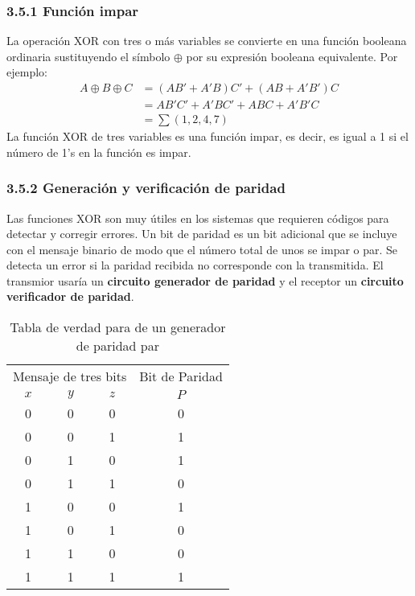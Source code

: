 \subsubsection*{3.5.1 Funci\'{o}n impar} La operaci\'{o}n XOR con tres o
m\'{a}s variables se convierte en una funci\'{o}n booleana ordinaria
sustituyendo el s\'{i}mbolo $\oplus$ por su expresi\'{o}n booleana equivalente.
Por ejemplo: \begin{align*} A \oplus B \oplus C & = (AB' + A'B)C' + (AB + A'B')C
               \\ &= AB'C' + A'BC' + ABC + A'B'C \\ &= \sum (1, 2, 4, 7)\end{align*} La
funci\'{o}n XOR de tres variables es una funci\'{o}n impar, es decir, es igual a
1 si el n\'{u}mero de 1's en la funci\'{o}n es impar.

\subsubsection*{3.5.2 Generaci\'{o}n y verificaci\'{o}n de paridad} Las
funciones XOR son muy \'{u}tiles en los sistemas que requieren c\'{o}digos para
detectar y corregir errores. Un bit de paridad es un bit adicional que se
incluye con el mensaje binario de modo que el n\'{u}mero total de unos se impar
o par. Se detecta un error si la paridad recibida no corresponde con la
transmitida. El transmior usar\'{i}a un \textbf{circuito generador de paridad} y
el receptor un \textbf{circuito verificador de paridad}.

\begin{table}[h] \centering \begin{tabular}{cccc} \multicolumn{3}{c}{Mensaje de
        tres bits} & Bit de Paridad \\ \cmidrule{1-3} \cmidrule{4-4} $x$ & $y$ & $z$ &
        $P$                         \\ \midrule 0 & 0 & 0 & 0 \\ 0 & 0 & 1 & 1 \\ 0 & 1 & 0 & 1 \\ 0 & 1 & 1 & 0
        \\ 1 & 0 & 0 & 1 \\ 1 & 0 & 1 & 0 \\ 1 & 1 & 0 & 0 \\ 1 & 1 & 1 & 1 \\
        \bottomrule\end{tabular} \caption{Tabla de verdad para de un generador de
        paridad par} \end{table}